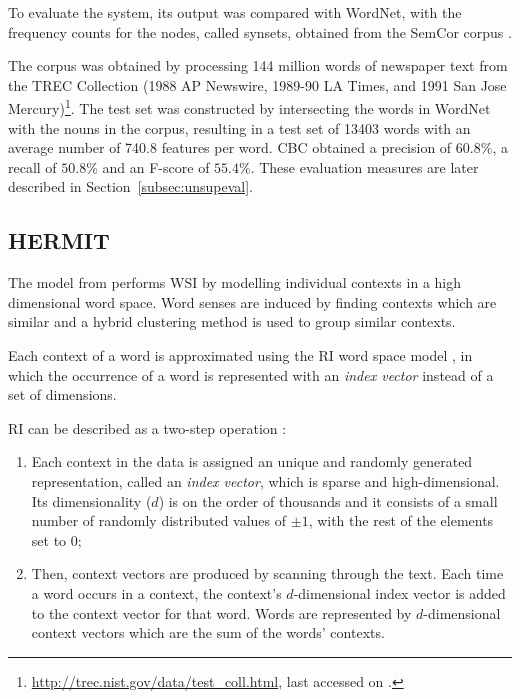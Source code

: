 To evaluate the system, its output was compared with WordNet, with the
frequency counts for the nodes, called synsets, obtained from the SemCor corpus 
\citep{miller1993semantic}.

The corpus was obtained by processing 144 million words of newspaper text from 
the TREC Collection (1988 AP Newswire, 1989-90 LA Times, and 1991 San Jose 
Mercury)\footnote{\url{http://trec.nist.gov/data/test_coll.html}, last 
accessed on .}. The test set was constructed by 
intersecting the words in WordNet 
with the nouns in the corpus, resulting in a test set of 13403 words with an 
average number of 740.8 features per word. \ac{CBC} obtained a precision of 
$60.8\%$, a recall of $50.8\%$ and an F-score of $55.4\%$. These evaluation 
measures are later described in Section~\ref{subsec:unsupeval}.

\subsection{HERMIT}

The model from \citet{jurgens2010hermit} performs \ac{WSI} by modelling 
individual contexts in a high dimensional word space. Word senses are induced 
by finding contexts which are similar and a hybrid clustering method is used to 
group similar contexts.

Each context of a word is approximated using the \ac{RI} word space model
\citep{kanerva2000random}, in which the occurrence of a word is represented with
an \textit{index vector} instead of a set of dimensions.

\ac{RI} can be described as a two-step operation
\citep{sahlgren2005introduction}:

\begin{enumerate}
 \item Each context in the data is assigned an unique and randomly generated
 representation, called an \textit{index vector}, which is sparse and
 high-dimensional. Its dimensionality ($d$) is on the order of thousands and
 it consists of a small number of randomly distributed values of $\pm1$, with 
 the rest of the elements set to $0$;
 \item Then, context vectors are produced by scanning through the text. Each
 time a word occurs in a context, the context's $d$-dimensional index vector is
 added to the context vector for that word. Words are represented by
 $d$-dimensional context vectors which are the sum of the words' contexts.
\end{enumerate}

